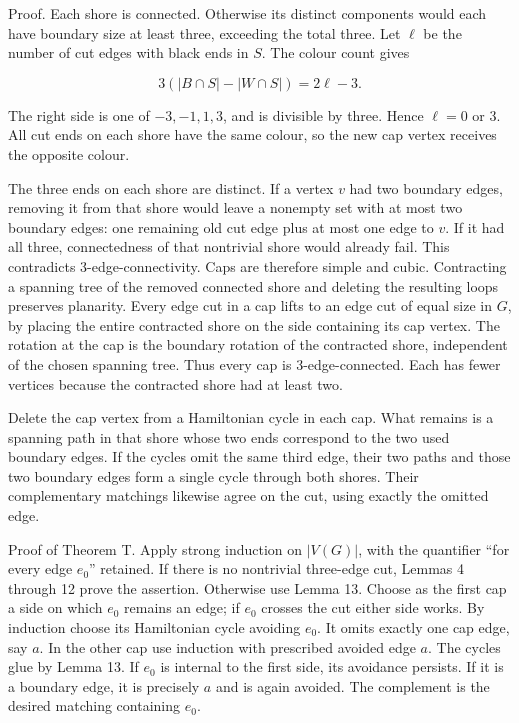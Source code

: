 \documentclass[a4paper,11pt]{amsart}
\begin{document}
Proof. Each shore is connected. Otherwise its distinct components would each have boundary size at least three, exceeding the total three. Let $\ell$ be the number of cut edges with black ends in $S$. The colour count gives

\begin{equation*}
3(|B\cap S|-|W\cap S|)=2\ell-3.
\end{equation*}

The right side is one of $-3,\allowbreak -1,\allowbreak 1,\allowbreak 3$, and is divisible by three. Hence $\ell=0$ or $3$. All cut ends on each shore have the same colour, so the new cap vertex receives the opposite colour.

The three ends on each shore are distinct. If a vertex $v$ had two boundary edges, removing it from that shore would leave a nonempty set with at most two boundary edges: one remaining old cut edge plus at most one edge to $v$. If it had all three, connectedness of that nontrivial shore would already fail. This contradicts 3-edge-connectivity. Caps are therefore simple and cubic. Contracting a spanning tree of the removed connected shore and deleting the resulting loops preserves planarity. Every edge cut in a cap lifts to an edge cut of equal size in $G$, by placing the entire contracted shore on the side containing its cap vertex. The rotation at the cap is the boundary rotation of the contracted shore, independent of the chosen spanning tree. Thus every cap is 3-edge-connected. Each has fewer vertices because the contracted shore had at least two.

Delete the cap vertex from a Hamiltonian cycle in each cap. What remains is a spanning path in that shore whose two ends correspond to the two used boundary edges. If the cycles omit the same third edge, their two paths and those two boundary edges form a single cycle through both shores. Their complementary matchings likewise agree on the cut, using exactly the omitted edge.

Proof of Theorem T. Apply strong induction on $|V(G)|$, with the quantifier ``for every edge $e_0$'' retained. If there is no nontrivial three-edge cut, Lemmas 4 through 12 prove the assertion. Otherwise use Lemma 13. Choose as the first cap a side on which $e_0$ remains an edge; if $e_0$ crosses the cut either side works. By induction choose its Hamiltonian cycle avoiding $e_0$. It omits exactly one cap edge, say $a$. In the other cap use induction with prescribed avoided edge $a$. The cycles glue by Lemma 13. If $e_0$ is internal to the first side, its avoidance persists. If it is a boundary edge, it is precisely $a$ and is again avoided. The complement is the desired matching containing $e_0$.
\end{document}

